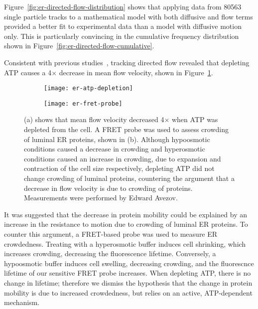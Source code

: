 Figure~\ref{fig:er-directed-flow-distribution} shows that applying data from \num{80563} single particle tracks to a mathematical model with both diffusive and flow terms provided a better fit to experimental data than a model with diffusive motion only. 
This is particularly convincing in the cumulative frequency distribution shown in Figure~\ref{fig:er-directed-flow-cumulative}. 

Consistent with previous studies~\cite{nehls2000dynamics}, tracking directed flow revealed that depleting ATP causes a 4$\times$ decrease in mean flow velocity, shown in Figure~\ref{fig:er-atp-depletion}. 

\begin{figure}[htbp!]
	\centering
	\begin{subfigure}[b]{0.3\textwidth}
		\texttt{[image: er-atp-depletion]}
		\caption{} \label{fig:er-atp-depletion}
	\end{subfigure}	
	\hspace{0.15\textwidth}
	\begin{subfigure}[b]{0.3\textwidth}
		\texttt{[image: er-fret-probe]}
		\caption{} \label{fig:er-fret-probe}
	\end{subfigure}	
	\caption[ER: Flow velocity is reduced upon ATP depletion; a FRET probe reveals this is not due to increased crowding]{(a) shows that mean flow velocity decreased 4$\times$ when ATP was depleted from the cell. A FRET probe was used to assess crowding of luminal ER proteins, shown in (b). Although hypoosmotic conditions caused a decrease in crowding and hyperosmotic conditions caused an increase in crowding, due to expansion and contraction of the cell size respectively, depleting ATP did not change crowding of luminal proteins, countering the argument that a decrease in flow velocity is due to crowding of proteins. Measurements were performed by Edward Avezov. } 
	\label{fig:er-atp}
\end{figure}

It was suggested that the decrease in protein mobility could be explained by an increase in the resistance to motion due to crowding of luminal ER proteins.
To counter this argument, a FRET-based probe was used to measure ER crowdedness.
Treating with a hyperosmotic buffer induces cell shrinking, which increases crowding, decreasing the fluorescence lifetime.
Conversely, a hypoosmotic buffer induces cell swelling, decreasing crowding, and the fluorescnce lifetime of our sensitive FRET probe increases.
When depleting ATP, there is no change in lifetime;
therefore we dismiss the hypothesis that the change in protein mobility is due to increased crowdedness, but relies on an active, ATP-dependent mechanism.

